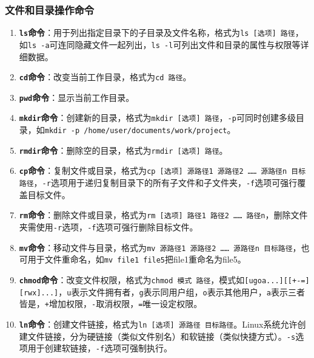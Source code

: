 \subsubsection{文件和目录操作命令}
\begin{enumerate}[label=\arabic*.]
    \item \textbf{\texttt{ls}命令}：用于列出指定目录下的子目录及文件名称，格式为\texttt{ls [选项] 路径}，如\texttt{ls -a}可连同隐藏文件一起列出，\texttt{ls -l}可列出文件和目录的属性与权限等详细数据。
    \item \textbf{\texttt{cd}命令}：改变当前工作目录，格式为\texttt{cd 路径}。
    \item \textbf{\texttt{pwd}命令}：显示当前工作目录。
    \item \textbf{\texttt{mkdir}命令}：创建新的目录，格式为\texttt{mkdir [选项] 路径}，\texttt{-p}可同时创建多级目录，如\texttt{mkdir -p /home/user/documents/work/project}。
    \item \textbf{\texttt{rmdir}命令}：删除空的目录，格式为\texttt{rmdir [选项] 路径}。
    \item \textbf{\texttt{cp}命令}：复制文件或目录，格式为\texttt{cp [选项] 源路径1 源路径2 …… 源路径n 目标路径}，\texttt{-r}选项用于递归复制目录下的所有子文件和子文件夹，\texttt{-f}选项可强行覆盖目标文件。
    \item \textbf{\texttt{rm}命令}：删除文件或目录，格式为\texttt{rm [选项] 路径1 路径2 …… 路径n}，删除文件夹需使用\texttt{-r}选项，\texttt{-f}选项可强行删除目标文件。
    \item \textbf{\texttt{mv}命令}：移动文件与目录，格式为\texttt{mv 源路径1 源路径2 …… 源路径n 目标路径}，也可用于文件重命名，如\texttt{mv file1 file5}把file1重命名为file5。
    \item \textbf{\texttt{chmod}命令}：改变文件权限，格式为\texttt{chmod 模式 路径}，模式如\texttt{[ugoa...][[+-=][rwx]...]}，\texttt{u}表示文件拥有者，\texttt{g}表示同用户组，\texttt{o}表示其他用户，\texttt{a}表示三者皆是，\texttt{+}增加权限，\texttt{-}取消权限，\texttt{=}唯一设定权限。
    \item \textbf{\texttt{ln}命令}：创建文件链接，格式为\texttt{ln [选项] 源路径 目标路径}。Linux系统允许创建文件链接，分为硬链接（类似文件别名）和软链接（类似快捷方式）。\texttt{-s}选项用于创建软链接，\texttt{-f}选项可强制执行。

\end{enumerate}
